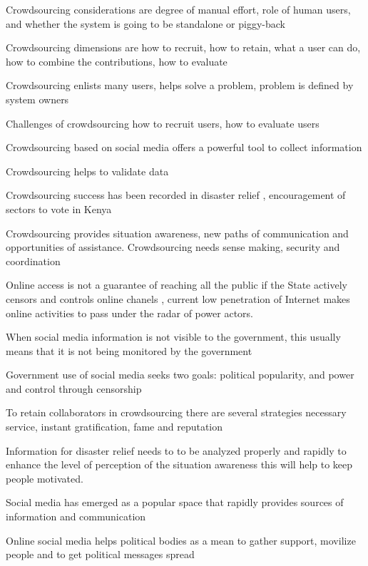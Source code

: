 \documentclass[a4paper,10pt]{article}
\begin{document}
Crowdsourcing considerations  are degree of manual effort, role of human users, and whether the system is going to be standalone or piggy-back \citep{doan2011}

Crowdsourcing dimensions are how to recruit, how to retain, what a user can do, how to combine the contributions, how to evaluate \citep{doan2011}

Crowdsourcing enlists many users, helps solve a problem, problem is defined by system owners \citep{doan2011}

Challenges of crowdsourcing how to recruit users, how to evaluate users \citep{doan2011}

Crowdsourcing based on social media offers a powerful tool to collect information \citep{gao2011}

Crowdsourcing helps to validate data \citep{gao2011}

Crowdsourcing success has been recorded in disaster relief \citep{yin2012}, encouragement of sectors to vote in Kenya \citep{map2014}


Crowdsourcing provides situation awareness, new paths of communication and opportunities of assistance. Crowdsourcing needs sense making, security and coordination \citep{gao2011}


Online access is not a guarantee of reaching all the public if the State actively censors and controls online chanels \citep{map2014}, current low penetration of Internet makes online activities to pass under the radar of power actors.

When social media information is not visible to the government, this usually means that it is not being monitored by the government \citep{yin2012}

Government use of social media seeks two goals:  political popularity, and power and control through censorship \citep{saadia2014}


To retain collaborators in crowdsourcing there are several strategies necessary service, instant gratification, fame and reputation \citep{doan2011}

Information for disaster relief needs to to be analyzed properly and rapidly to enhance the level of perception of the situation awareness \citep{yin2012} this will help to keep people motivated.


Social media has emerged as a popular space that rapidly provides sources of information and communication \citep{yin2012}


Online social media helps political bodies as a mean to gather support, movilize people and to get political messages spread \citep{map2014}
\end{document}
